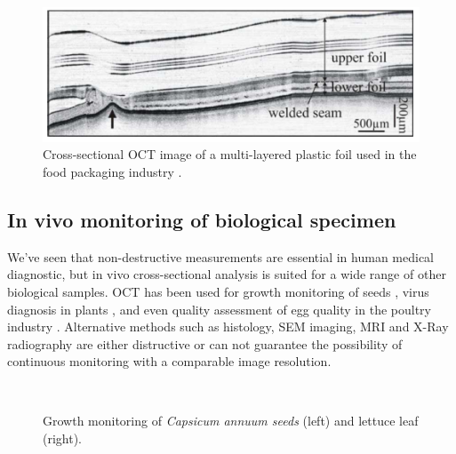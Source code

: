 \begin{figure}[hbt]
	\myfloatalign
	\includegraphics[width=0.5\linewidth]{gfx/ch1/material}
	\caption{Cross-sectional OCT image of a multi-layered plastic foil used in the food packaging industry \citep{Wiesauer2005}.}\label{fig:material}
\end{figure}

\subsection{In vivo monitoring of biological specimen}
We've seen that non-destructive measurements are essential in human medical diagnostic, but in vivo cross-sectional analysis is suited for a wide range of other biological samples. OCT has been used for growth monitoring of seeds \cite{Ravichandran2017}, virus diagnosis in plants \cite{Chow2009}, and even quality assessment of egg quality in the poultry industry \cite{Sabuncu2015}. Alternative methods such as histology, \ac{SEM} imaging, \ac{MRI} and X-Ray radiography are either distructive or can not guarantee the possibility of continuous monitoring with a comparable image resolution.

\begin{figure}[hbt]
	\myfloatalign
	 \quad
	\\
	\caption{Growth monitoring of \emph{Capsicum annuum seeds} \cite{Ravichandran2017} (left) and lettuce leaf \cite{Loeb2003} (right).}\label{fig:plant-monitoring}
\end{figure}

